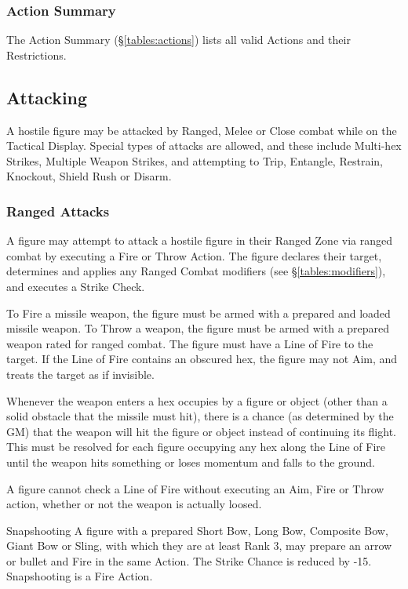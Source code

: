 \begin{multicols*}{3}
\subsubsection{Action Summary}

The Action Summary (\S \ref{tables:actions}) lists all valid Actions
and their Restrictions.

\subsection{Attacking}
\label{combat:attacking}

A hostile figure may be attacked by Ranged, Melee or Close combat
while on the Tactical Display. Special types of attacks are allowed,
and these include Multi-hex Strikes, Multiple Weapon Strikes, and
attempting to Trip, Entangle, Restrain, Knockout, Shield Rush or
Disarm.

\subsubsection{Ranged Attacks}

A figure may attempt to attack a hostile figure in their Ranged Zone
via ranged combat by executing a Fire or Throw Action. The figure
declares their target, determines and applies any Ranged Combat
modifiers (see \S \ref{tables:modifiers}), and executes a Strike
Check.

To Fire a missile weapon, the figure must be armed with a prepared and
loaded missile weapon. To Throw a weapon, the figure must be armed
with a prepared weapon rated for ranged combat. The figure must have a
Line of Fire to the target. If the Line of Fire contains an obscured
hex, the figure may not Aim, and treats the target as if invisible.

Whenever the weapon enters a hex occupies by a figure or object (other
than a solid obstacle that the missile must hit), there is a chance
(as determined by the GM) that the weapon will hit the figure or
object instead of continuing its flight. This must be resolved for
each figure occupying any hex along the Line of Fire until the weapon
hits something or loses momentum and falls to the ground.

A figure cannot check a Line of Fire without executing an Aim, Fire or
Throw action, whether or not the weapon is actually loosed.

\begin{Description}
\item[Snapshooting] A figure with a prepared Short Bow, Long Bow,
Composite Bow, Giant Bow or Sling, with which they are at least Rank
3, may prepare an arrow or bullet and Fire in the same Action. The
Strike Chance is reduced by -15. Snapshooting is a Fire Action.


\end{Description}
\end{multicols*}
